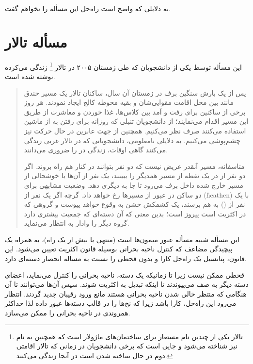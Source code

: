 \documentclass{book}
\begin{document}
    به دلایلی که واضح است راه‌حل این مسأله را نخواهم گفت. 


\section{مسأله تالار  }

    این مسأله توسط  یکی از دانشجویان  که طی زمستان ۲۰۰۵ در تالار \footnote{
    تالار  یکی از چندین نام مستعار برای ساختمان‌های ماژولار است که همچنین به نام  نیز شناخته می‌شود و جایی است که 
    برخی دانشجویان در زمانی که تالار اقامتی دوم در حال ساخته شدن است در آنجا زندگی می‌کنند.} 
    زندگی می‌کرده نوشته شده است. 

\begin{quote}
    پس از یک بارش سنگین برف در زمستان آن سال، ساکنان تالار   یک مسیر خندق مانند بین محل اقامت مقوایی‌شان  و بقیه محوطه کالج 
    ایجاد نمودند. هر روز برخی از ساکنین  برای رفت و آمد بین کلاس‌ها، غذا خوردن و معاشرت از طریق این مسیر اقدام می‌نمایند؛ از دانشجویان 
    تنبلی که روزانه  برای رفتن به    از ماشین استفاده می‌کنند صرف نظر می‌کنیم. همچنین از جهت عابرین در حال حرکت نیز چشم‌پوشی می‌کنیم. 
    به دلایلی نامعلومی، دانشجویانی که در تالار غربی زندگی می‌کنند گاهی اوقات، زندگی در  را ضروری می‌دانند. 
    

    متاسفانه، مسیر آنقدر عریض نیست که دو نفر بتوانند در کنار هم راه بروند. اگر دو نفر از  در یک نقطه از مسیر همدیگر را ببینند، 
    یک نفر از آن‌ها با خوشحالی از مسیر خارج شده داخل برف می‌رود تا جا به دیگری دهد. وضعیت مشابهی برای دو ساکن 
    در عبور از مسیر‌ها رخ خواهد داد. گرچه اگر یک نفر از  (\r{heathen}) 
    با یک نفر از   () به هم برسند، یک کشمکش خشن 
    به وقوع خواهد پیوست  و گروهی که در اکثریت است پیروز است؛ بدین معنی که آن دسته‌ای که جمعیت بیشتری دارد گروه دیگر را 
    وادار به انتظار می‌نماید. 
\end{quote}

    این مسأله شبیه مسأله عبور میمون‌ها است (منتهی با بیش از یک راه)، به همراه یک پیچیدگی مضاعف
     که کنترل ناحیه بحرانی بوسیله قانون اکثریت تعیین می‌شود. این قانون، پتانسیل یک راه‌حل کارا و بدون قحطی را نسبت به مسأله 
     انحصار دسته‌ای دارد. 

    قحطی ممکن نیست زیرا تا زمانیکه یک دسته، ناحیه بحرانی را کنترل می‌نماید، اعضای دسته دیگر به صف می‌پیوندند تا اینکه 
    تبدیل به اکثریت شوند. سپس آن‌ها می‌توانند تا آن هنگامی که منتظر خالی شدن ناحیه بحرانی هستند مانع ورود رقیبان جدید گردند.
    انتظار می‌رود این راه‌حل، کارا باشد زیرا  که نخ‌ها را در قالب دسته‌ها عبور داده لذا حداکثر همروندی در 
    ناحیه بحرانی را ممکن می‌سازد. 
\end{document}
